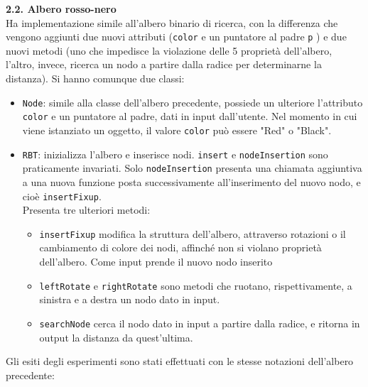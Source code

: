 \documentclass[]{article}
\begin{document}
{\large \textbf{{\Large{2}}.{\small{2}}. Albero rosso-nero}}\\
Ha implementazione simile all'albero binario di ricerca, con la differenza che vengono aggiunti due nuovi attributi (\texttt{color} e un puntatore al padre \texttt{p} ) 
e due nuovi metodi (uno che impedisce la violazione delle 5 proprietà dell'albero, l'altro, invece, ricerca un nodo a partire dalla radice per determinarne la distanza). 
Si hanno comunque due classi:\\
\begin{itemize}
  \item \texttt{Node}: simile alla classe dell'albero precedente, possiede un ulteriore l'attributo \texttt{color} e un puntatore al padre, dati in input dall'utente. 
  Nel momento in cui viene istanziato un oggetto, il valore \texttt{color} può essere "Red" o "Black".
  \item \texttt{RBT}: inizializza l'albero e inserisce nodi. \texttt{insert} e \texttt{nodeInsertion} sono praticamente invariati. Solo 
  \texttt{nodeInsertion} presenta una chiamata aggiuntiva a una nuova funzione posta successivamente all'inserimento del nuovo nodo, e cioè \texttt{insertFixup}.\\
  Presenta tre ulteriori metodi:
  \begin{itemize}
    \item \texttt{insertFixup} modifica la struttura dell'albero, attraverso rotazioni o il cambiamento di colore dei nodi, affinché non si violano proprietà dell'albero. Come input prende il nuovo nodo inserito
    \item \texttt{leftRotate} e \texttt{rightRotate} sono metodi che ruotano, rispettivamente, a sinistra e a destra un nodo dato in input.
    \item \texttt{searchNode} cerca il nodo dato in input a partire dalla radice, e ritorna in output la distanza da quest'ultima.
  \end{itemize}  
\end{itemize}
Gli esiti degli esperimenti sono stati effettuati con le stesse notazioni dell'albero precedente:
\begin{table}[H]
\end{table}
\end{document}
